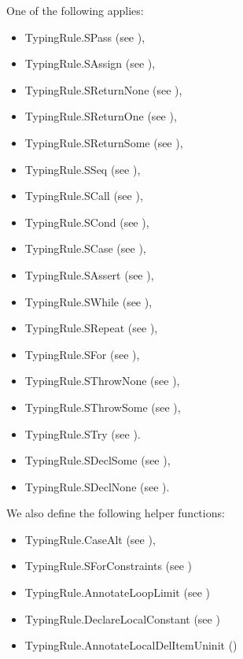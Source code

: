 One of the following applies:
\begin{itemize}
  \item TypingRule.SPass (see ),
  \item TypingRule.SAssign (see ),
  \item TypingRule.SReturnNone (see ),
  \item TypingRule.SReturnOne (see ),
  \item TypingRule.SReturnSome (see ),
  \item TypingRule.SSeq (see ),
  \item TypingRule.SCall (see ),
  \item TypingRule.SCond (see ),
  \item TypingRule.SCase (see ),
  \item TypingRule.SAssert (see ),
  \item TypingRule.SWhile (see ),
  \item TypingRule.SRepeat (see ),
  \item TypingRule.SFor (see ),
  \item TypingRule.SThrowNone (see ),
  \item TypingRule.SThrowSome (see ),
  \item TypingRule.STry (see ).
  \item TypingRule.SDeclSome (see ),
  \item TypingRule.SDeclNone (see ).
\end{itemize}

We also define the following helper functions:
\begin{itemize}
  \item TypingRule.CaseAlt (see ),
  \item TypingRule.SForConstraints (see )
  \item TypingRule.AnnotateLoopLimit (see )
  \item TypingRule.DeclareLocalConstant (see )
  \item TypingRule.AnnotateLocalDelItemUninit ()
\end{itemize}


